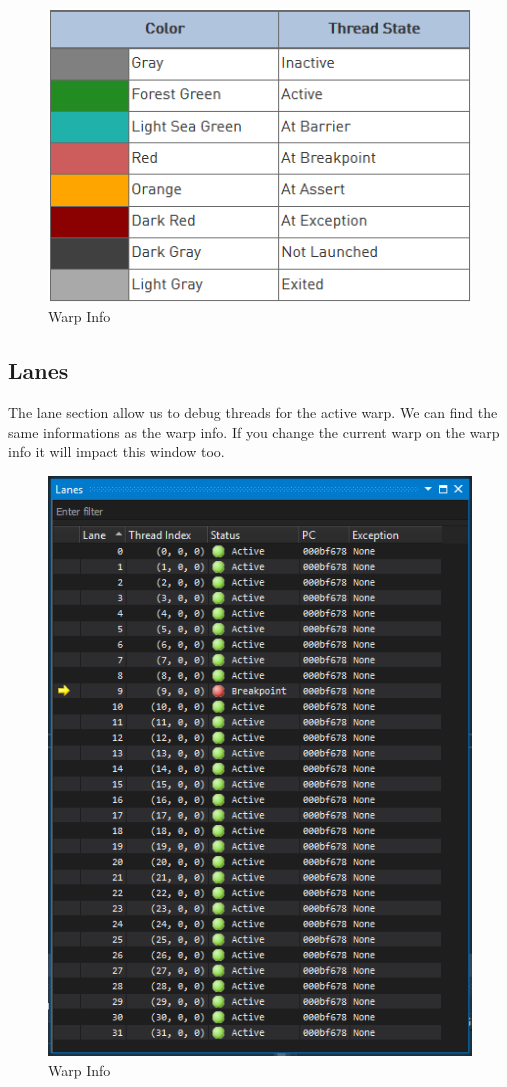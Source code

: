 \documentclass{article}
\begin{document}
\begin{figure}[h]
	\centering
	\includegraphics[scale=0.6]{figures/threadstate.png}
	\caption{Warp Info}
\end{figure}

\newpage
\subsection{Lanes}
The lane section allow us to debug threads for the active warp. We can find the same informations as the warp info. If you change the current warp on the warp info it will impact this window too.
\begin{figure}[h]
	\centering
	\includegraphics[scale=0.6]{figures/lanes.png}
	\caption{Warp Info}
\end{figure}
\end{document}
